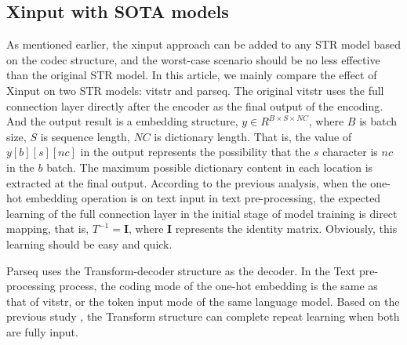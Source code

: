 \documentclass[runningheads]{llncs}
\begin{document}
\subsection{Xinput with SOTA models}


As mentioned earlier, the xinput approach can be added to any STR model based on the codec structure, and the worst-case scenario should be no less effective than the original STR model. In this article, we mainly compare the effect of Xinput on two STR models: vitstr and parseq. The original vitstr uses the full connection layer directly after the encoder as the final output of the encoding. And the output result is a embedding structure, $y\in R^{B\times S\times NC}$, where $B$ is batch size, $S$ is sequence length, $NC$ is dictionary length. That is, the value of $y[b][s][nc]$ in the output represents the possibility that the $s$ character is $nc$ in the $b$ batch. The maximum possible dictionary content in each location is extracted at the final output. According to the previous analysis, when the one-hot embedding operation is on text input in text pre-processing, the expected learning of the full connection layer in the initial stage of model training is direct mapping, that is, $\textit{T}^{-1} = \mathbf{I}$, where $\mathbf{I}$ represents the identity matrix. Obviously, this learning should be easy and quick.

Parseq uses the Transform-decoder structure as the decoder. In the Text pre-processing process, the coding mode of the one-hot embedding is the same as that of vitstr, or the token input mode of the same language model. Based on the previous study \cite{}, the Transform structure can complete repeat learning when both are fully input.
\end{document}
